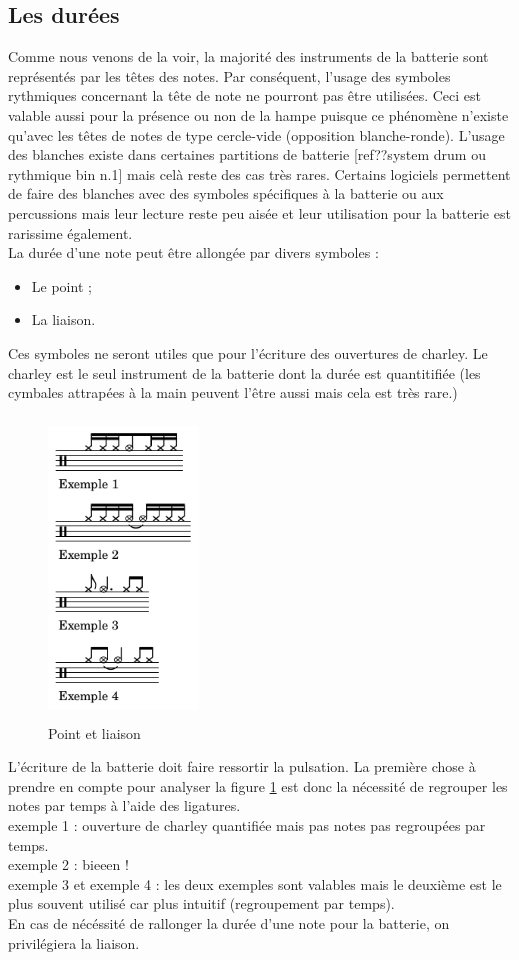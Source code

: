 \subsection*{Les durées}
\label{hho}
Comme nous venons de la voir, la majorité des instruments de la batterie sont représentés par les têtes des notes. Par conséquent, l’usage des symboles rythmiques concernant la tête de note ne pourront pas être utilisées. Ceci est valable aussi pour la présence ou non de la hampe puisque ce phénomène n’existe qu’avec les têtes de notes de type cercle-vide (opposition blanche-ronde). L’usage des blanches existe dans certaines partitions de batterie [ref??system drum ou rythmique bin n.1] mais celà reste des cas très rares. Certains logiciels permettent de faire des blanches avec des symboles spécifiques à la batterie ou aux percussions mais leur lecture reste peu aisée et leur utilisation pour la batterie est rarissime également.\\
La durée d’une note peut être allongée par divers symboles :
\begin{itemize}
	\item Le point ;
	\item La liaison.
\end{itemize}
Ces symboles ne seront utiles que pour l’écriture des ouvertures de charley. Le charley est le seul instrument de la batterie dont la durée est quantitifiée (les cymbales attrapées à la main peuvent l’être aussi mais cela est très rare.)\newpage
\begin{figure}[h]
	\centering
	\includegraphics[height=80mm, width=40mm]{z_images/3_methodes/0_notation_de_la_batterie/3_point_et_liaison.png}
	\caption{Point et liaison}
	\label{point_liaison}
\end{figure}
L’écriture de la batterie doit faire ressortir la pulsation. La première chose à prendre en compte pour analyser la figure \ref{point_liaison} est donc la nécessité de regrouper les notes par temps à l’aide des ligatures.\\
exemple 1 : ouverture de charley quantifiée mais pas notes pas regroupées par temps.\\
exemple 2 : bieeen !\\
exemple 3 et exemple 4 : les deux exemples sont valables mais le deuxième est le plus souvent utilisé car plus intuitif (regroupement par temps).\\
En cas de nécéssité de rallonger la durée d’une note pour la batterie, on privilégiera la liaison.
